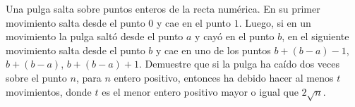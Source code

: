 Una pulga salta sobre puntos enteros de la recta numérica. En su primer movimiento salta desde el punto $0$ y cae en el punto $1$. Luego, si en un movimiento la pulga saltó desde el punto $a$ y cayó en el punto $b$, en el siguiente movimiento salta desde el punto $b$ y cae en uno de los puntos $b+(b-a)-1$, $b+(b-a)$, $b+(b-a)+1$. \newline 
Demuestre que si la pulga ha caído dos veces sobre el punto $n$, para $n$ entero positivo, entonces ha debido hacer al menos $t$ movimientos, donde $t$ es el menor entero positivo mayor o igual que $2\sqrt{n}$.
